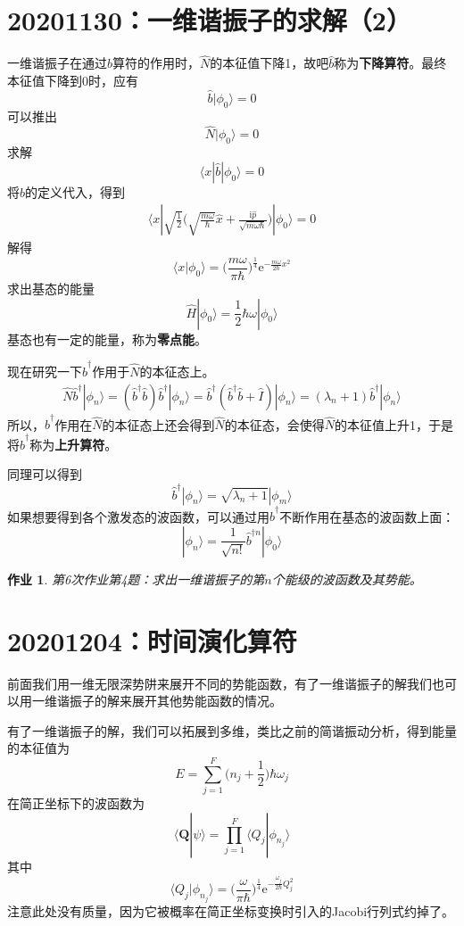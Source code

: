 \documentclass[12pt]{article}
\newtheorem{asg}{作业}
\begin{document}
\section{20201130：一维谐振子的求解（2）}

一维谐振子在通过$\hat{b}$算符的作用时，$\hat{N}$的本征值下降1，故吧$\hat{b}$称为\textbf{下降算符}。最终本征值下降到0时，应有
\[ \hat{b}|\phi_0 \rangle = 0 \]
可以推出
\[ \hat{N}|\phi_0 \rangle = 0 \]
求解
\[ \langle x|\hat{b}|\phi_0 \rangle = 0\]
将$\hat{b}$的定义代入，得到
\begin{align*}
    \langle x|\sqrt{\frac 12}\bigg(\sqrt{\frac {m\omega}{\hbar}}\hat{x}+ \frac {\mathrm{i}\hat{p}}{\sqrt{m\omega\hbar}}\bigg)|\phi_0 \rangle = 0
\end{align*}
解得
\[ \langle x|\phi_0\rangle = \bigg(\frac {m\omega}{\pi\hbar} \bigg)^{\frac 14} \mathrm{e}^{-\frac {m\omega}{2\hbar}x^2} \]
求出基态的能量
\[ \hat{H}|\phi_0 \rangle = \frac 12 \hbar \omega |\phi_0 \rangle \]
基态也有一定的能量，称为\textbf{零点能}。

现在研究一下$\hat{b}^\dagger$作用于$\hat{N}$的本征态上。
\begin{align*}
    \hat{N}\hat{b}^\dagger |\phi_n \rangle = (\hat{b}^\dagger \hat{b})\hat{b}^\dagger |\phi_n \rangle = \hat{b}^\dagger (\hat{b}^\dagger\hat{b}+\hat{I})|\phi_n \rangle = (\lambda_n+1) \hat{b}^\dagger |\phi_n \rangle
\end{align*}
所以，$\hat{b}^\dagger$作用在$\hat{N}$的本征态上还会得到$\hat{N}$的本征态，会使得$\hat{N}$的本征值上升1，于是将$\hat{b}^\dagger$称为\textbf{上升算符}。

同理可以得到
\[ \hat{b}^\dagger|\phi_n\rangle = \sqrt{\lambda_n+1}|\phi_m\rangle \]
如果想要得到各个激发态的波函数，可以通过用$\hat{b}^\dagger$不断作用在基态的波函数上面：
\[ |\phi_n \rangle = \frac 1{\sqrt{n!}} \hat{b}^{\dagger n} | \phi_0 \rangle \]

\begin{asg}
    第6次作业第4题：求出一维谐振子的第$n$个能级的波函数及其势能。
\end{asg}

\section{20201204：时间演化算符}

前面我们用一维无限深势阱来展开不同的势能函数，有了一维谐振子的解我们也可以用一维谐振子的解来展开其他势能函数的情况。

有了一维谐振子的解，我们可以拓展到多维，类比之前的简谐振动分析，得到能量的本征值为
\[ E = \sum_{j=1}^F \bigg(n_j+\frac 12\bigg)\hbar \omega_j \]
在简正坐标下的波函数为
\[ \langle \bm{Q}|\psi \rangle = \prod_{j=1}^F \langle Q_j | \phi_{n_j} \rangle \]
其中
\[ \langle Q_j|\phi_{n_j} \rangle = \bigg(\frac {\omega}{\pi \hbar}\bigg)^{\frac 14} \mathrm{e}^{-\frac {\omega_j}{2\hbar} Q_j^2} \]
注意此处没有质量，因为它被概率在简正坐标变换时引入的Jacobi行列式约掉了。
\end{document}
